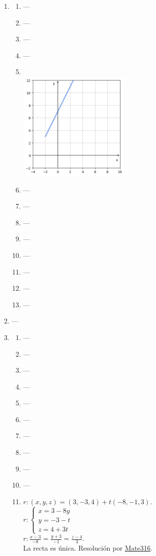\documentclass[a4paper]{article}
\newcommand{\exercise}{\item}
\newcommand{\SEL}[1]{\left\{\begin{matrix} #1 \end{matrix}\right.}
\begin{document}
\begin{enumerate}
\begin{enumerate} [label=(\alph*)]
		\item Reemplazamos $\SEL{x=-1-6k \\ y=3k \hfill}$ en $2x-y-3=0$ y obtenemos $k=-\frac{1}{3}$. Por lo tanto, $r \cap s=\left\{ \left(1,-1\right)\right\}$. Además $\overrightarrow{n_r}=(2,-1)$ es paralela a $\overrightarrow{d_s}=(-6,3)$, por lo que $r \perp s$.
\item ---\item ---\item ---\end{enumerate}\exercise\begin{enumerate} [label=(\alph*)]\item ---\item ---\item ---\item ---		\item ~\\[-10pt] \includegraphics[width=55mm]{plots/plot1.png}
\item ---\item ---\item ---\item ---\item ---\item ---\item ---\item ---\end{enumerate}\exercise---\exercise\begin{enumerate} [label=(\alph*)]\item ---\item ---\item ---\item ---\item ---\item ---\item ---\item ---\item ---\item ---		\item $r: (x,y,z)=(3,-3,4)+t(-8,-1,3)$. \\ $r: \left\{\begin{matrix}x=3-8y\\y=-3-t\\z=4+3t\end{matrix}\right.$ \\ $r: \displaystyle{\frac{x-3}{-8}=\frac{y+3}{-1}=\frac{z-4}{3}}$. \\ La recta es única. Resolución por \href{https://youtu.be/KebOzsUUmq4?t=458}{Mate316}.

\end{enumerate}
\end{enumerate}
\end{document}
